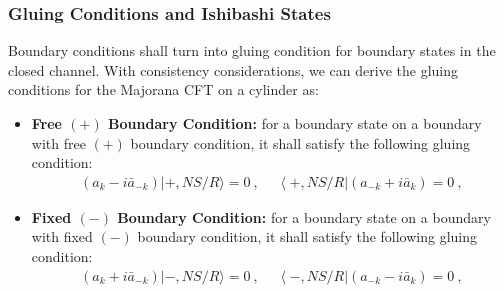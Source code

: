 \subsubsection{Gluing Conditions and Ishibashi States}

Boundary conditions shall turn into gluing condition for boundary states in the closed channel. With consistency considerations, we can derive the gluing conditions for the Majorana CFT on a cylinder as:
\begin{itemize}
  \item \textbf{Free $ (+) $ Boundary Condition:} for a boundary state on a boundary with free $ (+) $ boundary condition, it shall satisfy the following gluing condition:
    \begin{align}
      \left(a_{k}-i\bar{a}_{-k}\right)|+, NS/R \rangle=0\mathrm{~,~}\quad\left\langle +, NS/R\right|\left(a_{-k}+i\bar{a}_{k}\right)=0\mathrm{~,}
    \end{align}
  \item \textbf{Fixed $ (-) $ Boundary Condition:} for a boundary state on a boundary with fixed $ (-) $ boundary condition, it shall satisfy the following gluing condition:
    \begin{align}
      \left(a_{k}+i\bar{a}_{-k}\right)|-, NS/R \rangle=0\mathrm{~,~}\quad\left\langle -, NS/R\right|\left(a_{-k}-i\bar{a}_{k}\right)=0\mathrm{~,}
    \end{align}
\end{itemize}

